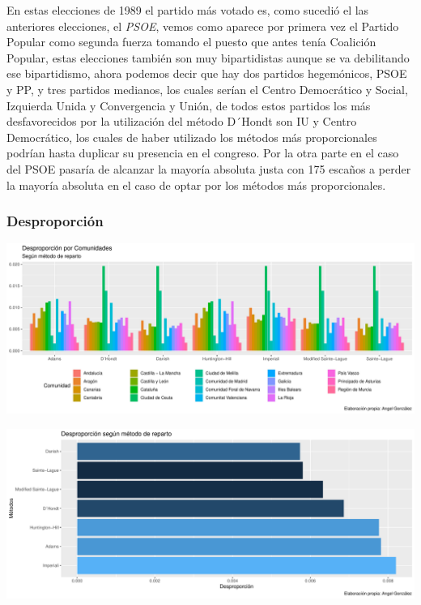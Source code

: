 \documentclass[12pt,a4paper,]{book}
\numberwithin{dummy}{section}
\theoremstyle{ocrenumbox}
\theoremstyle{blacknumex}
\theoremstyle{blacknumbox}
\theoremstyle{ocrenum}
\theoremstyle{ocrenum}
\begin{document}
En estas elecciones de 1989 el partido más votado es, como sucedió el
las anteriores elecciones, el \emph{PSOE}, vemos como aparece por
primera vez el Partido Popular como segunda fuerza tomando el puesto que
antes tenía Coalición Popular, estas elecciones también son muy
bipartidistas aunque se va debilitando ese bipartidismo, ahora podemos
decir que hay dos partidos hegemónicos, PSOE y PP, y tres partidos
medianos, los cuales serían el Centro Democrático y Social, Izquierda
Unida y Convergencia y Unión, de todos estos partidos los más
desfavorecidos por la utilización del método D´Hondt son IU y Centro
Democrático, los cuales de haber utilizado los métodos más
proporcionales podrían hasta duplicar su presencia en el congreso. Por
la otra parte en el caso del PSOE pasaría de alcanzar la mayoría
absoluta justa con 175 escaños a perder la mayoría absoluta en el caso
de optar por los métodos más proporcionales.

\hypertarget{desproporciuxf3n-4}{%
\subsubsection{Desproporción}\label{desproporciuxf3n-4}}

\begin{center}\includegraphics[width=0.95\linewidth]{figurasR/unnamed-chunk-99-1} \end{center}

\begin{center}\includegraphics[width=0.95\linewidth]{figurasR/unnamed-chunk-99-2} \end{center}
\end{document}
